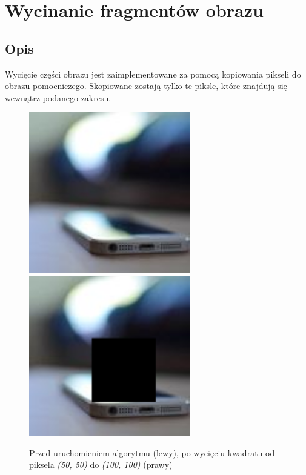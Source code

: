 \documentclass[a4paper,12pt]{book}
\begin{document}
\section{Wycinanie fragmentów obrazu}
\subsection*{Opis}
Wycięcie części obrazu jest zaimplementowane za pomocą kopiowania pikseli do obrazu pomocniczego. Skopiowane zostają tylko te piksle, które znajdują się wewnątrz podanego zakresu. 

\begin{figure}[H]
	\caption{Przed uruchomieniem algorytmu (lewy), po wycięciu kwadratu od piksela \textit{(50, 50)} do \textit{(100, 100)} (prawy)}
	\includegraphics[width=7cm, height=7cm]{phone-unmodified.jpg}
	\includegraphics[width=7cm, height=7cm]{4-5/crop-phone.png}
\end{figure}
\end{document}
